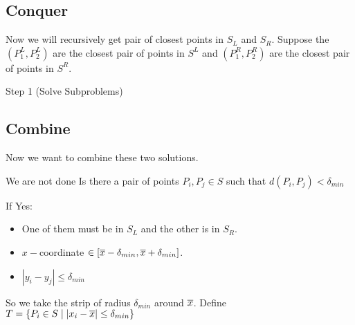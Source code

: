 \begin{center}
\begin{minipage}{0.35\textwidth}
\begin{tikzpicture}[x=0.75pt,y=0.75pt,yscale=-1,xscale=1]
\end{tikzpicture}


    \end{minipage}
\end{center}

\subsection{Conquer} Now we will recursively get pair of closest points in $S_L$ and $S_R$. Suppose the $(P_1^L,P_2^L)$ are the closest pair of points in $S^L$ and $(P_1^R,P_2^R)$ are the closest pair of points in $S^R$.

\begin{algorithm}[H]
        \DontPrintSemicolon
            \caption{Step 1 (Solve Subproblems)}
        \end{algorithm}

\subsection{Combine}     Now we want to combine these two solutions. 
\begin{question}{We are not done}{}
Is there a pair of points $P_i,P_j\in S$ such that $d(P_i,P_j)<\delta_{min}$
\end{question}
If Yes: \begin{itemize}
\item One of them must be in $S_L$ and the other is in $S_R$. 
\item $x-$coordinate $\in [\ovx-\delta_{min},\ovx+\delta_{min}]$. 
\item $|y_i-y_j|\leq \delta_{min}$
\end{itemize}
\parinf 

So we take the strip of radius $\delta_{min}$ around $\ovx$. Define $T=\{P_i\in S\mid |x_i-\ovx|\leq \delta_{min}\}$

